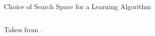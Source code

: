 \begin{frame}{Choice of Search Space for a Learning Algorithm}
\begin{columns}
\begin{column}{0.4\textwidth}
\begin{center}
{        }


        {\tiny Taken from .}

      \end{center}
    \end{column}
  \end{columns}
\end{frame}


